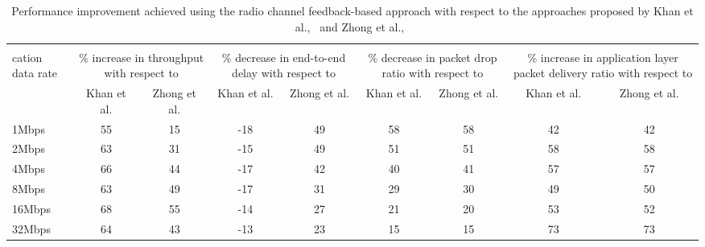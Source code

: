 \begin{table}[!htb]
	\centering
    \caption{Performance improvement achieved using the radio channel feedback-based approach with respect to the approaches proposed by Khan et al.,~\cite{khan2015towards} and Zhong et al.,~\cite{zhong2014capacity}}
  \label{tab:topology4RadioChannelImprovement}
  \renewcommand\multirowsetup{\centering}
    \begin{tabular}{|>{\centering} p{}|c|c|c|c|c|c|c|c|}
    \hline
    \multirow{2}{0.05\textwidth}{\newline \newline \newline Appli-\\cation data rate} & \multicolumn{2}{|p{0.08\textwidth}|}{\centering\% increase in throughput with respect to} & \multicolumn{2}{|p{0.08\textwidth}|}{\centering\% decrease in end-to-end delay with respect to} & \multicolumn{2}{|p{0.08\textwidth}|}{\centering\% decrease in packet drop ratio with respect to} & \multicolumn{2}{|p{0.08\textwidth}|}{\centering\% increase in application layer packet delivery ratio with respect to}\\
    \cline{2-9}
          & \multicolumn{1}{|p{0.025\textwidth}|}{\centering Khan et al.} & \multicolumn{1}{|p{0.025\textwidth}|}{\centering Zhong et al.} & \multicolumn{1}{|p{0.025\textwidth}|}{\centering Khan et al.} & \multicolumn{1}{|p{0.025\textwidth}|}{\centering Zhong et al.} & \multicolumn{1}{|p{0.03\textwidth}|}{\centering Khan et al.} & \multicolumn{1}{|p{0.025\textwidth}|}{\centering Zhong et al.} & \multicolumn{1}{|p{0.025\textwidth}|}{\centering Khan et al.} & \multicolumn{1}{|p{0.025\textwidth}|}{\centering Zhong et al.}\\
    \hline 
    1Mbps & 55 & 15 & -18 & 49 & 58 & 58 & 42 & 42 \\\hline 
    2Mbps & 63 & 31 & -15 & 49 & 51 & 51 & 58 & 58 \\\hline 
    4Mbps & 66 & 44 & -17 & 42 & 40 & 41 & 57 & 57 \\\hline 
    8Mbps & 63 & 49 & -17 & 31 & 29 & 30 & 49 & 50 \\\hline 
    16Mbps & 68 & 55 & -14 & 27 & 21 & 20 & 53 & 52 \\\hline 
    32Mbps & 64 & 43 & -13 & 23 & 15 & 15 & 73 & 73 \\\hline 
    \end{tabular}%
    \vspace{-0.625cm}
\end{table}


